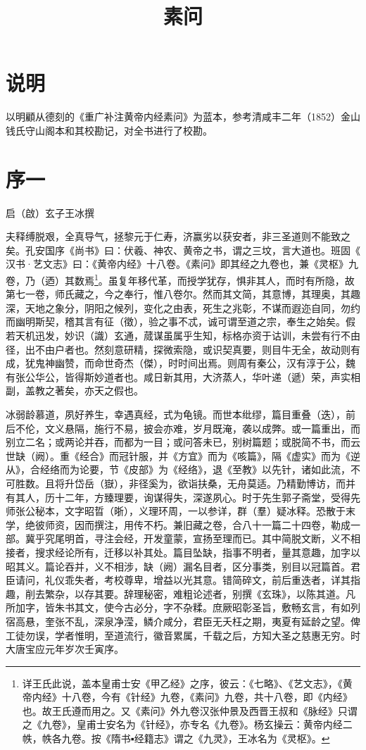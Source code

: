 \documentclass[a4paper,12pt,UTF8,twoside]{ctexbook}
\title{\heiti\zihao{0} 素问}
\date{}
\begin{document}
\maketitle

\tableofcontents

\frontmatter
\chapter{说明}
以明顧从德刻的《重广补注黄帝内经素问》为蓝本，参考清咸丰二年（1852）金山钱氏守山阁本和其校勘记，对全书进行了校勘。

\chapter{序一}

启（啟）玄子王冰撰

夫释缚脱艰，全真导气，拯黎元于仁寿，济赢劣以获安者，非三圣道则不能致之矣。孔安国序《尚书》曰：伏羲、神农、黄帝之书，谓之三坟，言大道也。班固《 汉书·艺文志》曰：《黄帝内经》十八卷。《素问》即其经之九卷也，兼《灵枢》九卷，乃（迺）其数焉\footnote{详王氏此说，盖本皇甫士安《甲乙经》之序，彼云：《七略》、《艺文志》，《黄帝内经》十八卷，今有《针经》九卷，《素问》九卷，共十八卷，即《内经》也。故王氏遵而用之。又《素问》外九卷汉张仲景及西晋王叔和《脉经》只谓之《九卷》，皇甫士安名为《针经》，亦专名《九卷》。杨玄操云：黄帝内经二帙，帙各九卷。按《隋书▪经籍志》谓之《九灵》，王冰名为《灵枢》。}。虽复年移代革，而授学犹存，惧非其人，而时有所隐，故第七一卷，师氏藏之，今之奉行，惟八卷尔。然而其文简，其意博，其理奥，其趣深，天地之象分，阴阳之候列，变化之由表，死生之兆彰，不谋而遐迩自同，勿约而幽明斯契，稽其言有征（徵），验之事不忒，诚可谓至道之宗，奉生之始矣。假若天机迅发，妙识（識）玄通，蒇谋虽属乎生知，标格亦资于诂训，未尝有行不由径，出不由户者也。然刻意研精，探微索隐，或识契真要，则目牛无全，故动则有成，犹鬼神幽赞，而命世奇杰（傑），时时间出焉。则周有秦公，汉有淳于公，魏有张公华公，皆得斯妙道者也。咸日新其用，大济蒸人，华叶递（遞）荣，声实相副，盖教之著矣，亦天之假也。

冰弱龄慕道，夙好养生，幸遇真经，式为龟镜。而世本纰缪，篇目重叠（迭），前后不伦，文义悬隔，施行不易，披会亦难，岁月既淹，袭以成弊。或一篇重出，而别立二名；或两论并吞，而都为一目；或问答未已，别树篇题；或脱简不书，而云世缺（阙）。重《经合》而冠针服，并《方宜》而为《咳篇》，隔《虚实》而为《逆从》，合经络而为论要，节《皮部》为《经络》，退《至教》以先针，诸如此流，不可胜数。且将升岱岳（嶽），非径奚为，欲诣扶桑，无舟莫适。乃精勤博访，而并有其人，历十二年，方臻理要，询谋得失，深遂夙心。时于先生郭子斋堂，受得先师张公秘本，文字昭晢（晣），义理环周，一以参详，群（羣）疑冰释。恐散于末学，绝彼师资，因而撰注，用传不朽。兼旧藏之卷，合八十一篇二十四卷，勒成一部。冀乎究尾明首，寻注会经，开发童蒙，宣扬至理而已。其中简脱文断，义不相接者，搜求经论所有，迁移以补其处。篇目坠缺，指事不明者，量其意趣，加字以昭其义。篇论吞并，义不相涉，缺（阙）漏名目者，区分事类，别目以冠篇首。君臣请问，礼仪乖失者，考校尊卑，增益以光其意。错简碎文，前后重迭者，详其指趣，削去繁杂，以存其要。辞理秘密，难粗论述者，别撰《玄珠》，以陈其道。凡所加字，皆朱书其文，使今古必分，字不杂糅。庶厥昭彰圣旨，敷畅玄言，有如列宿高悬，奎张不乱，深泉净滢，鳞介咸分，君臣无夭枉之期，夷夏有延龄之望。俾工徒勿误，学者惟明，至道流行，徽音累属，千载之后，方知大圣之慈惠无穷。时大唐宝应元年岁次壬寅序。
\end{document}
